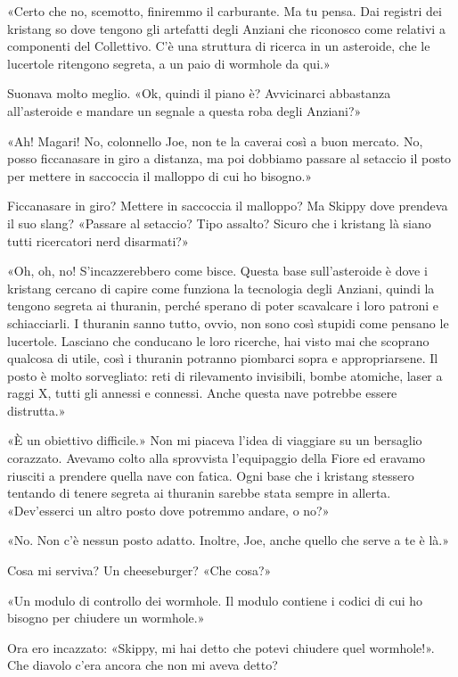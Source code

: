 «Certo che no, scemotto, finiremmo il carburante. Ma tu pensa. Dai
registri dei kristang so dove tengono gli artefatti degli Anziani che
riconosco come relativi a componenti del Collettivo. C'è una struttura
di ricerca in un asteroide, che le lucertole ritengono segreta, a un
paio di wormhole da qui.»

Suonava molto meglio. «Ok, quindi il piano è? Avvicinarci abbastanza
all'asteroide e mandare un segnale a questa roba degli Anziani?»

«Ah! Magari! No, colonnello Joe, non te la caverai così a buon mercato.
No, posso ficcanasare in giro a distanza, ma poi dobbiamo passare al
setaccio il posto per mettere in saccoccia il malloppo di cui ho
bisogno.»

Ficcanasare in giro? Mettere in saccoccia il malloppo? Ma Skippy dove
prendeva il suo slang? «Passare al setaccio? Tipo assalto? Sicuro che i
kristang là siano tutti ricercatori nerd disarmati?»

«Oh, oh, no! S'incazzerebbero come bisce. Questa base sull'asteroide è
dove i kristang cercano di capire come funziona la tecnologia degli
Anziani, quindi la tengono segreta ai thuranin, perché sperano di poter
scavalcare i loro patroni e schiacciarli. I thuranin sanno tutto, ovvio,
non sono così stupidi come pensano le lucertole. Lasciano che conducano
le loro ricerche, hai visto mai che scoprano qualcosa di utile, così i
thuranin potranno piombarci sopra e appropriarsene. Il posto è molto
sorvegliato: reti di rilevamento invisibili, bombe atomiche, laser a
raggi X, tutti gli annessi e connessi. Anche questa nave potrebbe essere
distrutta.»

«È un obiettivo difficile.» Non mi piaceva l'idea di viaggiare su un
bersaglio corazzato. Avevamo colto alla sprovvista l'equipaggio della
Fiore ed eravamo riusciti a prendere quella nave con fatica. Ogni base
che i kristang stessero tentando di tenere segreta ai thuranin sarebbe
stata sempre in allerta. «Dev'esserci un altro posto dove potremmo
andare, o no?»

«No. Non c'è nessun posto adatto. Inoltre, Joe, anche quello che serve a
te è là.»

Cosa mi serviva? Un cheeseburger? «Che cosa?»

«Un modulo di controllo dei wormhole. Il modulo contiene i codici di cui
ho bisogno per chiudere un wormhole.»

Ora ero incazzato: «Skippy, mi hai detto che potevi chiudere quel
wormhole!». Che diavolo c'era ancora che non mi aveva detto?

